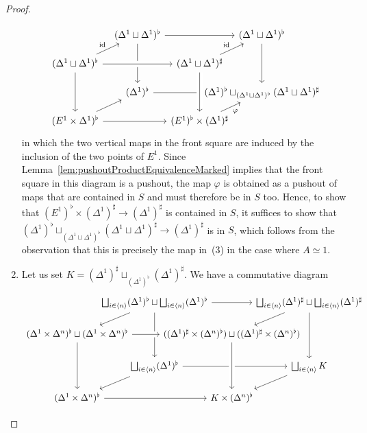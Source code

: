 \documentclass[reqno]{amsart}
\numberwithin{equation}{subsection}
\theoremstyle{plain}
\theoremstyle{definition}
\let\phi=\varphi
\DeclareMathOperator{\id}{id}
\newcommand{\ord}[1]{\langle#1\rangle}
\begin{document}
\begin{proof}
\begin{enumerate}
\begin{equation*}
\begin{tikzcd}[column sep={6.5em,between origins}, row sep={3em,between origins}]
	 		& (\Delta^1\sqcup\Delta^1)^\flat\arrow[rr]\arrow[dd] && (\Delta^1\sqcup\Delta^1)^\flat\arrow[dd]\\
	 		(\Delta^1\sqcup\Delta^1)^\flat\arrow[ur, "\id"]\arrow[rr, crossing over]\arrow[dd] && (\Delta^1\sqcup\Delta^1)^\sharp \arrow[ur, "\id"]&\\
	 		& (\Delta^1)^\flat\arrow[rr] && (\Delta^1)^\flat\sqcup_{(\Delta^1\sqcup\Delta^1)^\flat}(\Delta^1\sqcup\Delta^1)^\sharp\\
	 		(E^1\times\Delta^1)^\flat\arrow[rr] \arrow[ur]&& (E^1)^\flat\times(\Delta^1)^\sharp\arrow[ur, "\phi"']\arrow[from=uu, crossing over] &
	 	\end{tikzcd}
	 	\end{equation*}
	 	in which the two vertical maps in the front square are induced by the inclusion of the two points of $E^1$. Since Lemma~\ref{lem:pushoutProductEquivalenceMarked} implies that the front square in this diagram is a pushout, the map $\phi$ is obtained as a pushout of maps that are contained in $S$ and must therefore be in $S$ too. Hence, to show that $(E^1)^\flat\times(\Delta^1)^\sharp\to(\Delta^1)^\sharp$ is contained in $S$, it suffices to show that $(\Delta^1)^\flat\sqcup_{(\Delta^1\sqcup\Delta^1)^\flat}(\Delta^1\sqcup\Delta^1)^\sharp\to (\Delta^1)^\sharp$ is in $S$, which follows from the observation that this is precisely the map in~(3) in the case where $A\simeq 1$.
	 	\item	Let us set $K= (\Delta^1)^\sharp\sqcup_{(\Delta^1)^\flat}(\Delta^1)^\sharp$. We have a commutative diagram
	 	\begin{equation*}
	 		\begin{tikzcd}[column sep={8.5em,between origins}, row sep={3.5em,between origins}]
	 			& \bigsqcup_{i\in \ord{n}}(\Delta^1)^\flat \sqcup \bigsqcup_{i\in \ord{n}}(\Delta^1)^\flat \arrow[rr]\arrow[dl]\arrow[dd] && \bigsqcup_{i\in \ord{n}}(\Delta^1)^\sharp \sqcup \bigsqcup_{i\in \ord{n}}(\Delta^1)^\sharp\arrow[dl]\arrow[dd]\\
	 			(\Delta^1\times\Delta^n)^\flat\sqcup (\Delta^1\times\Delta^n)^\flat\arrow[rr, crossing over]\arrow[dd] && ((\Delta^1)^\sharp\times(\Delta^n)^\flat)\sqcup ((\Delta^1)^\sharp\times(\Delta^n)^\flat)\arrow[dd] & \\
	 			&\bigsqcup_{i\in \ord{n}}(\Delta^1)^\flat \arrow[rr] \arrow[dl] && \bigsqcup_{i\in \ord{n}} K\arrow[dl]\\
	 			(\Delta^1\times\Delta^n)^\flat\arrow[rr] && K\times(\Delta^n)^\flat\arrow[from=uu, crossing over]
	 		\end{tikzcd}

\end{equation*}
\end{enumerate}
\end{proof}
\end{document}

